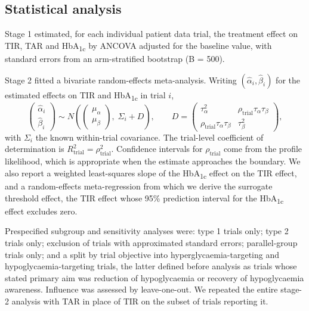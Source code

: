 \documentclass[11pt,a4paper]{article}
\begin{document}
\subsection{Statistical analysis}
Stage 1 estimated, for each individual patient data trial, the treatment effect on TIR, TAR and
HbA\textsubscript{1c} by ANCOVA adjusted for the baseline value, with standard errors from an arm-stratified
bootstrap (B = 500).

Stage 2 fitted a bivariate random-effects meta-analysis. Writing $(\hat{\alpha}_i,\hat{\beta}_i)$ for the
estimated effects on TIR and HbA\textsubscript{1c} in trial $i$,
\[
\begin{pmatrix}\hat{\alpha}_i\\ \hat{\beta}_i\end{pmatrix}\sim
N\!\left(\begin{pmatrix}\mu_\alpha\\ \mu_\beta\end{pmatrix},\;
\Sigma_i + D\right),\qquad
D=\begin{pmatrix}\tau^2_\alpha & \rho_{\mathrm{trial}}\tau_\alpha\tau_\beta\\
\rho_{\mathrm{trial}}\tau_\alpha\tau_\beta & \tau^2_\beta\end{pmatrix},
\]
with $\Sigma_i$ the known within-trial covariance. The trial-level coefficient of determination is
$R^2_{\mathrm{trial}}=\rho^2_{\mathrm{trial}}$. Confidence intervals for $\rho_{\mathrm{trial}}$ come from
the profile likelihood, which is appropriate when the estimate approaches the boundary. We also report a
weighted least-squares slope of the HbA\textsubscript{1c} effect on the TIR effect, and a random-effects
meta-regression from which we derive the surrogate threshold effect, the TIR effect whose 95\% prediction
interval for the HbA\textsubscript{1c} effect excludes zero.\citep{burzykowski2006}

Prespecified subgroup and sensitivity analyses were: type 1 trials only; type 2 trials only; exclusion of
trials with approximated standard errors; parallel-group trials only; and a split by trial objective into
hyperglycaemia-targeting and hypoglycaemia-targeting trials, the latter defined before analysis as trials
whose stated primary aim was reduction of hypoglycaemia or recovery of hypoglycaemia awareness. Influence was
assessed by leave-one-out. We repeated the entire stage-2 analysis with TAR in place of TIR on the subset of
trials reporting it.
\end{document}
